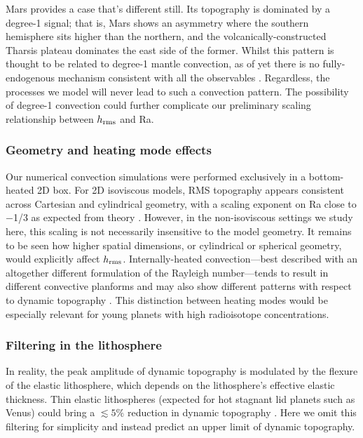 Mars provides a case that's different still. Its topography is dominated by a degree-1 signal; that is, Mars shows an asymmetry where the southern hemisphere sits higher than the northern, and the volcanically-constructed Tharsis plateau dominates the east side of the former. Whilst this pattern is thought to be related to degree-1 mantle convection, as of yet there is no fully-endogenous mechanism consistent with all the observables \citep{roberts_chapter_2021}. Regardless, the processes we model will never lead to such a convection pattern. The possibility of degree-1 convection could further complicate our preliminary scaling relationship between $h_{\rm rms}$ and Ra.



\subsubsection{Geometry and heating mode effects}

Our numerical convection simulations were performed exclusively in a bottom-heated 2D box. For 2D isoviscous models, RMS topography appears consistent across Cartesian and cylindrical geometry, with a scaling exponent on Ra close to $-$1/3 as expected from theory \citep{mckenzie_convection_1974, parsons_relationship_1983}. However, in the non-isoviscous settings we study here, this scaling is not necessarily insensitive to the model geometry. It remains to be seen how higher spatial dimensions, or cylindrical or spherical geometry, would explicitly affect $h_{\rm rms}$. Internally-heated convection---best described with an altogether different formulation of the Rayleigh number---tends to result in different convective planforms and may also show different patterns with respect to dynamic topography \citep[e.g.,][]{orth_isostatic_2011}. This distinction between heating modes would be especially relevant for young planets with high radioisotope concentrations.





\subsubsection{Filtering in the lithosphere} \label{sec:elastic}

In reality, the peak amplitude of dynamic topography is modulated by the flexure of the elastic lithosphere, which depends on the lithosphere's effective elastic thickness. Thin elastic lithospheres (expected for hot stagnant lid planets such as Venus) could bring a $\lesssim 5\%$ reduction in dynamic topography \citep{golle_topography_2012, dumoulin_predicting_2013, patocka_elasticity_2019}. Here we omit this filtering for simplicity and instead predict an upper limit of dynamic topography.

